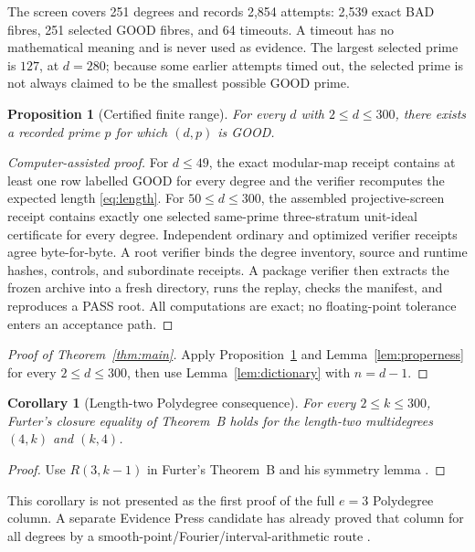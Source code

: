 \documentclass[11pt]{article}
\newtheorem{proposition}[theorem]{Proposition}
\newtheorem{corollary}[theorem]{Corollary}
\theoremstyle{definition}
\begin{document}
The screen covers 251 degrees and records 2,854 attempts: 2,539 exact BAD
fibres, 251 selected GOOD fibres, and 64 timeouts.  A timeout has no
mathematical meaning and is never used as evidence.  The largest selected
prime is $127$, at $d=280$; because some earlier attempts timed out, the
selected prime is not always claimed to be the smallest possible GOOD prime.

\begin{proposition}[Certified finite range]\label{prop:finite}
For every $d$ with $2\le d\le300$, there exists a recorded prime $p$ for
which $(d,p)$ is GOOD.
\end{proposition}

\begin{proof}[Computer-assisted proof]
For $d\le49$, the exact modular-map receipt contains at least one row labelled
GOOD for every degree and the verifier recomputes the expected length
\eqref{eq:length}.  For $50\le d\le300$, the assembled projective-screen
receipt contains exactly one selected same-prime three-stratum unit-ideal
certificate for every degree.  Independent ordinary and optimized verifier
receipts agree byte-for-byte.  A root verifier binds the degree inventory,
source and runtime hashes, controls, and subordinate receipts.  A package
verifier then extracts the frozen archive into a fresh directory, runs the
replay, checks the manifest, and reproduces a PASS root.  All computations are
exact; no floating-point tolerance enters an acceptance path.
\end{proof}

\begin{proof}[Proof of Theorem~\ref{thm:main}]
Apply Proposition~\ref{prop:finite} and Lemma~\ref{lem:properness} for every
$2\le d\le300$, then use Lemma~\ref{lem:dictionary} with $n=d-1$.
\end{proof}

\begin{corollary}[Length-two Polydegree consequence]\label{cor:polydegree}
For every $2\le k\le300$, Furter's closure equality of Theorem~B holds for
the length-two multidegrees $(4,k)$ and $(k,4)$.
\end{corollary}

\begin{proof}
Use $R(3,k-1)$ in Furter's Theorem~B and his symmetry lemma
\cite{Furter2015}.
\end{proof}

This corollary is not presented as the first proof of the full $e=3$
Polydegree column.  A separate Evidence Press candidate has already proved
that column for all degrees by a smooth-point/Fourier/interval-arithmetic
route \cite{FullE3Candidate}.
\end{document}
